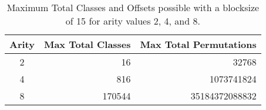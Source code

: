 \begin{table}[h]
\begin{center}
\begin{tabular}{crr}
\toprule
Arity & \multicolumn{1}{c}{Max Total Classes} &
\multicolumn{1}{c}{Max Total Permutations}\\
\midrule
2 & 16 & 32768\\
4 & 816 & 1073741824\\
8 & 170544 & 35184372088832\\
\bottomrule
\end{tabular}
\caption{Maximum Total Classes and Offsets possible with a blocksize of 15 for arity 
    values 2, 4, and 8.}
\label{tab:maxclass}
\end{center}
\end{table}
